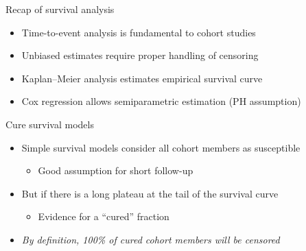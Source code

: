 \documentclass[aspectratio=169,12pt]{beamer} %
\begin{document}
\begin{frame}{Recap of survival analysis}
	\begin{itemize}
		\item Time-to-event analysis is fundamental to cohort studies
		\item Unbiased estimates require proper handling of censoring
		\item Kaplan--Meier analysis estimates empirical survival curve
		\item Cox regression allows semiparametric estimation (PH assumption)
	\end{itemize}
\end{frame}

\begin{frame}{Cure survival models}
	\begin{itemize}
		\item Simple survival models consider all cohort members as susceptible
		\begin{itemize}
			\item Good assumption for short follow-up
		\end{itemize}
	\item But if there is a long plateau at the tail of the survival curve
		\begin{itemize}
			\item Evidence for a ``cured'' fraction
		\end{itemize}
	\item \emph{By definition, 100\% of cured cohort members will be censored}
	\end{itemize}
\end{frame}
\end{document}
